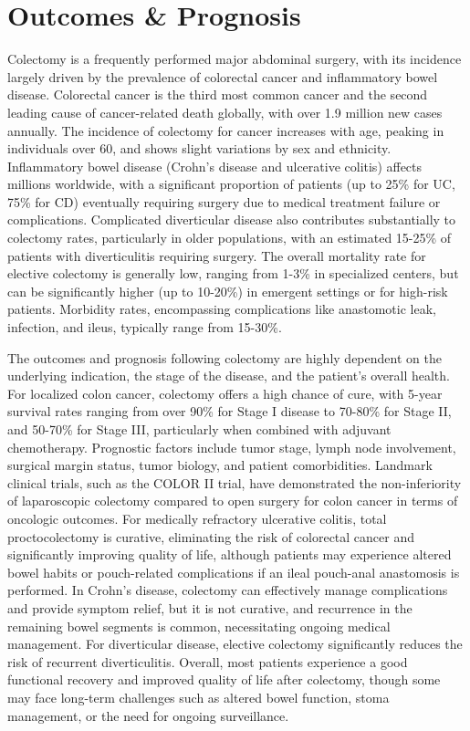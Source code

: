 \section*{Outcomes \& Prognosis}
Colectomy is a frequently performed major abdominal surgery, with its incidence largely driven by the prevalence of colorectal cancer and inflammatory bowel disease. Colorectal cancer is the third most common cancer and the second leading cause of cancer-related death globally, with over 1.9 million new cases annually. The incidence of colectomy for cancer increases with age, peaking in individuals over 60, and shows slight variations by sex and ethnicity. Inflammatory bowel disease (Crohn's disease and ulcerative colitis) affects millions worldwide, with a significant proportion of patients (up to 25\% for UC, 75\% for CD) eventually requiring surgery due to medical treatment failure or complications. Complicated diverticular disease also contributes substantially to colectomy rates, particularly in older populations, with an estimated 15-25\% of patients with diverticulitis requiring surgery. The overall mortality rate for elective colectomy is generally low, ranging from 1-3\% in specialized centers, but can be significantly higher (up to 10-20\%) in emergent settings or for high-risk patients. Morbidity rates, encompassing complications like anastomotic leak, infection, and ileus, typically range from 15-30\%.

The outcomes and prognosis following colectomy are highly dependent on the underlying indication, the stage of the disease, and the patient's overall health. For localized colon cancer, colectomy offers a high chance of cure, with 5-year survival rates ranging from over 90\% for Stage I disease to 70-80\% for Stage II, and 50-70\% for Stage III, particularly when combined with adjuvant chemotherapy. Prognostic factors include tumor stage, lymph node involvement, surgical margin status, tumor biology, and patient comorbidities. Landmark clinical trials, such as the COLOR II trial, have demonstrated the non-inferiority of laparoscopic colectomy compared to open surgery for colon cancer in terms of oncologic outcomes. For medically refractory ulcerative colitis, total proctocolectomy is curative, eliminating the risk of colorectal cancer and significantly improving quality of life, although patients may experience altered bowel habits or pouch-related complications if an ileal pouch-anal anastomosis is performed. In Crohn's disease, colectomy can effectively manage complications and provide symptom relief, but it is not curative, and recurrence in the remaining bowel segments is common, necessitating ongoing medical management. For diverticular disease, elective colectomy significantly reduces the risk of recurrent diverticulitis. Overall, most patients experience a good functional recovery and improved quality of life after colectomy, though some may face long-term challenges such as altered bowel function, stoma management, or the need for ongoing surveillance.

